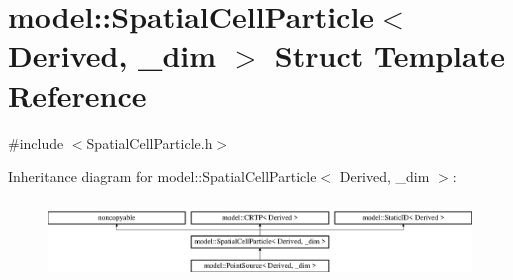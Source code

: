 \hypertarget{structmodel_1_1_spatial_cell_particle}{}\section{model\+:\+:Spatial\+Cell\+Particle$<$ Derived, \+\_\+dim $>$ Struct Template Reference}
\label{structmodel_1_1_spatial_cell_particle}


{\ttfamily \#include $<$Spatial\+Cell\+Particle.\+h$>$}

Inheritance diagram for model\+:\+:Spatial\+Cell\+Particle$<$ Derived, \+\_\+dim $>$\+:\begin{figure}[H]
\begin{center}
\leavevmode
\includegraphics[height=2.105263cm]{structmodel_1_1_spatial_cell_particle}
\end{center}
\end{figure}
